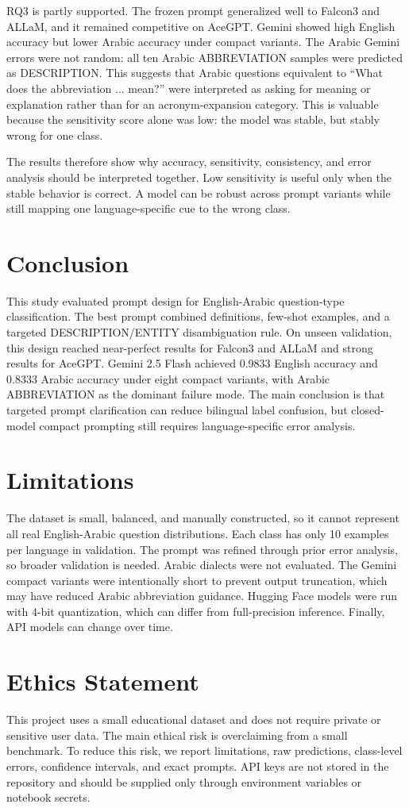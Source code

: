\documentclass[10pt,twocolumn]{article}
\begin{document}
RQ3 is partly supported. The frozen prompt generalized well to Falcon3 and ALLaM, and it remained competitive on AceGPT. Gemini showed high English accuracy but lower Arabic accuracy under compact variants. The Arabic Gemini errors were not random: all ten Arabic ABBREVIATION samples were predicted as DESCRIPTION. This suggests that Arabic questions equivalent to ``What does the abbreviation ... mean?'' were interpreted as asking for meaning or explanation rather than for an acronym-expansion category. This is valuable because the sensitivity score alone was low: the model was stable, but stably wrong for one class.

The results therefore show why accuracy, sensitivity, consistency, and error analysis should be interpreted together. Low sensitivity is useful only when the stable behavior is correct. A model can be robust across prompt variants while still mapping one language-specific cue to the wrong class.
\section{Conclusion}
This study evaluated prompt design for English-Arabic question-type classification. The best prompt combined definitions, few-shot examples, and a targeted DESCRIPTION/ENTITY disambiguation rule. On unseen validation, this design reached near-perfect results for Falcon3 and ALLaM and strong results for AceGPT. Gemini 2.5 Flash achieved 0.9833 English accuracy and 0.8333 Arabic accuracy under eight compact variants, with Arabic ABBREVIATION as the dominant failure mode. The main conclusion is that targeted prompt clarification can reduce bilingual label confusion, but closed-model compact prompting still requires language-specific error analysis.
\section*{Limitations}
The dataset is small, balanced, and manually constructed, so it cannot represent all real English-Arabic question distributions. Each class has only 10 examples per language in validation. The prompt was refined through prior error analysis, so broader validation is needed. Arabic dialects were not evaluated. The Gemini compact variants were intentionally short to prevent output truncation, which may have reduced Arabic abbreviation guidance. Hugging Face models were run with 4-bit quantization, which can differ from full-precision inference. Finally, API models can change over time.
\section*{Ethics Statement}
This project uses a small educational dataset and does not require private or sensitive user data. The main ethical risk is overclaiming from a small benchmark. To reduce this risk, we report limitations, raw predictions, class-level errors, confidence intervals, and exact prompts. API keys are not stored in the repository and should be supplied only through environment variables or notebook secrets.
\end{document}
